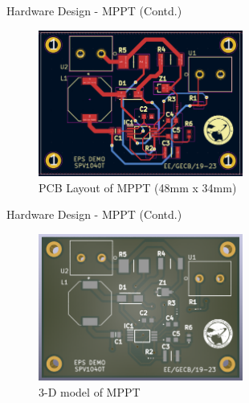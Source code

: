 \documentclass[aspectratio=169]{beamer}
\begin{document}
		\begin{frame}{Hardware Design - MPPT (Contd.) }
			\begin{figure}[h]
				\centering
				\includegraphics[width=0.6\textwidth]{diag/MpptDemopcb.png}
				\caption{PCB Layout of MPPT (48mm x 34mm)}
				\label{fig:mesh1}
			\end{figure}
		\end{frame}
		\begin{frame}{Hardware Design - MPPT (Contd.)}
			\begin{figure}[h]
				\centering
				\includegraphics[width=0.6\textwidth]{diag/MpptDemo3d.png}
				\caption{3-D model of MPPT}
				\label{fig:mesh1}
			\end{figure}
		\end{frame}
\end{document}
